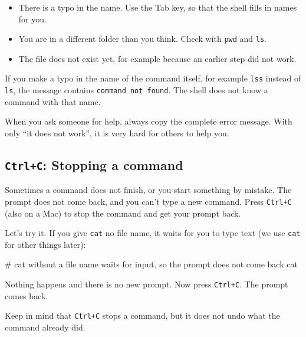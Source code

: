 \documentclass[
  letterpaper,
  DIV=11,
  numbers=noendperiod]{scrreprt}
\newenvironment{Shaded}{}{}
\newcommand{\CommentTok}[1]{\textcolor[rgb]{0.42,0.45,0.49}{#1}}
\newcommand{\FunctionTok}[1]{\textcolor[rgb]{0.44,0.26,0.76}{#1}}
\providecommand{\tightlist}{%
  \setlength{\itemsep}{0pt}\setlength{\parskip}{0pt}}
\begin{document}
\begin{itemize}
\tightlist
\item
  There is a typo in the name. Use the Tab key, so that the shell fills
  in names for you.
\item
  You are in a different folder than you think. Check with \texttt{pwd}
  and \texttt{ls}.
\item
  The file does not exist yet, for example because an earlier step did
  not work.
\end{itemize}

If you make a typo in the name of the command itself, for example
\texttt{lss} instead of \texttt{ls}, the message contains
\texttt{command\ not\ found}. The shell does not know a command with
that name.

When you ask someone for help, always copy the complete error message.
With only ``it does not work'', it is very hard for others to help you.

\subsection{\texorpdfstring{\texttt{Ctrl+C}: Stopping a
command}{Ctrl+C: Stopping a command}}\label{ctrlc-stopping-a-command}

Sometimes a command does not finish, or you start something by mistake.
The prompt does not come back, and you can't type a new command. Press
\texttt{Ctrl+C} (also on a Mac) to stop the command and get your prompt
back.

Let's try it. If you give \texttt{cat} no file name, it waits for you to
type text (we use \texttt{cat} for other things later):

\begin{Shaded}
\begin{Highlighting}[]
\CommentTok{\# cat without a file name waits for input, so the prompt does not come back}
\FunctionTok{cat}
\end{Highlighting}
\end{Shaded}

Nothing happens and there is no new prompt. Now press \texttt{Ctrl+C}.
The prompt comes back.

Keep in mind that \texttt{Ctrl+C} stops a command, but it does not undo
what the command already did.
\end{document}
